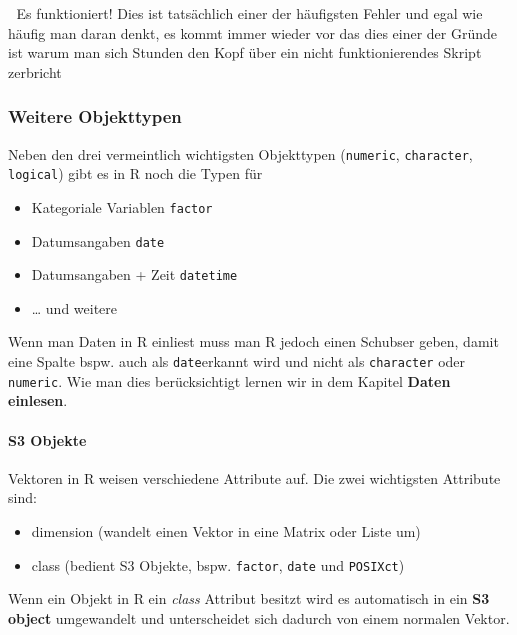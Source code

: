 \documentclass[
]{article}
\providecommand{\tightlist}{%
  \setlength{\itemsep}{0pt}\setlength{\parskip}{0pt}}
\begin{document}
💪 Es funktioniert! Dies ist tatsächlich einer der häufigsten Fehler und egal wie häufig man daran denkt, es kommt immer wieder vor das dies einer der Gründe ist warum man sich Stunden den Kopf über ein nicht funktionierendes Skript zerbricht 🤯

\hypertarget{weitere-objekttypen}{%
\subsubsection{Weitere Objekttypen}\label{weitere-objekttypen}}

Neben den drei vermeintlich wichtigsten Objekttypen (\texttt{numeric}, \texttt{character}, \texttt{logical}) gibt es in R noch die Typen für

\begin{itemize}
\tightlist
\item
  Kategoriale Variablen \texttt{factor}
\item
  Datumsangaben \texttt{date}
\item
  Datumsangaben + Zeit \texttt{datetime}
\item
  \ldots{} und weitere
\end{itemize}

Wenn man Daten in R einliest muss man R jedoch einen Schubser geben, damit eine Spalte bspw. auch als \texttt{date}erkannt wird und nicht als \texttt{character} oder \texttt{numeric}. Wie man dies berücksichtigt lernen wir in dem Kapitel \textbf{Daten einlesen}.

\hypertarget{s3-objekte}{%
\paragraph{S3 Objekte}\label{s3-objekte}}

Vektoren in R weisen verschiedene Attribute auf. Die zwei wichtigsten Attribute sind:

\begin{itemize}
\tightlist
\item
  dimension (wandelt einen Vektor in eine Matrix oder Liste um)
\item
  class (bedient S3 Objekte, bspw. \texttt{factor}, \texttt{date} und \texttt{POSIXct})
\end{itemize}

Wenn ein Objekt in R ein \emph{class} Attribut besitzt wird es automatisch in ein \textbf{S3 object} umgewandelt und unterscheidet sich dadurch von einem normalen Vektor.
\end{document}
